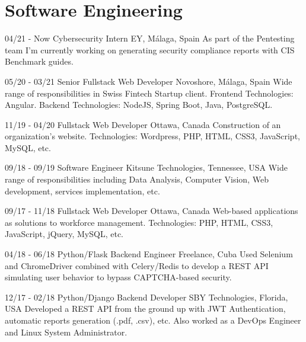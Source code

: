 \documentclass[]{friggeri-cv}
\begin{document}
\section{Software Engineering}
\begin{entrylist}
  \entry
    {04/21 - Now}
    {Cybersecurity Intern}
    {EY, Málaga, Spain}
    {As part of the Pentesting team I'm currently working on generating security compliance reports with CIS Benchmark guides.\\}

  \entry
    {05/20 - 03/21}
    {Senior Fullstack Web Developer}
    {Novoshore, Málaga, Spain}
    {Wide range of responsibilities in Swiss Fintech Startup client. Frontend Technologies: Angular. Backend Technologies: NodeJS, Spring Boot, Java, PostgreSQL.\\}

  \entry
    {11/19 - 04/20}
    {Fullstack Web Developer}
    {Ottawa, Canada} %
    {Construction of an organization's website. Technologies: Wordpress, PHP, HTML, CSS3, JavaScript, MySQL, etc.\\} 

  \entry
    {09/18 - 09/19}
    {Software Engineer}
    {Kitsune Technologies, Tennessee, USA}
    {Wide range of responsibilities including Data Analysis, Computer Vision, Web development, services implementation, etc.\\}

  \entry
    {09/17 - 11/18}
    {Fullstack Web Developer}
    {Ottawa, Canada} %
    {Web-based applications as solutions to workforce management. Technologies: PHP, HTML, CSS3, JavaScript, jQuery, MySQL, etc.\\} 

  \entry
    {04/18 - 06/18}
    {Python/Flask Backend Engineer}
    {Freelance, Cuba} %
    {Used Selenium and ChromeDriver combined with Celery/Redis to develop a REST API simulating user behavior to bypass CAPTCHA-based security.\\}  

  \entry
    {12/17 - 02/18}
    {Python/Django Backend Developer}
    {SBY Technologies, Florida, USA}   
    {Developed a REST API from the ground up with JWT Authentication, automatic reports generation (.pdf, .csv), etc. Also worked as a DevOps Engineer and Linux System Administrator.\\}    


\end{entrylist}
\end{document}
